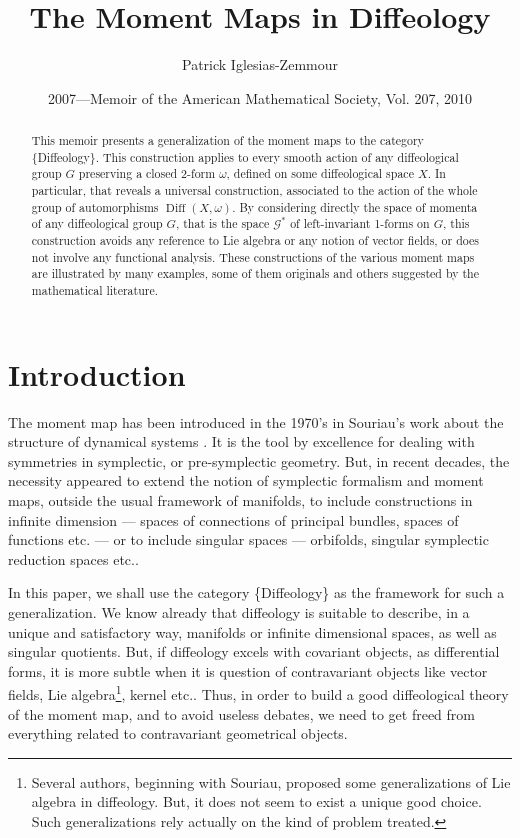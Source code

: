 \documentclass[10pt,reqno,twoside]{amsart}
\title{The Moment Maps in Diffeology}
\author{Patrick Iglesias-Zemmour}
\date{2007---Memoir of the American Mathematical Society, Vol. 207, 2010}
\newcommand{\cG}{\mathcal{G}}
\DeclareMathOperator{\Diff}{Diff}
\theoremstyle{plain}
\theoremstyle{definition}
\begin{document}
  
  \begin{abstract}
    This memoir presents a generalization of the moment maps to the category \{Diffeology\}.
    This construction applies to every smooth action of any diffeological group $G$ preserving a closed 2-form $\omega$,
    defined on some diffeological space $X$.
    In particular,
    that reveals a universal construction,
    associated to the action of the whole group of automorphisms $\Diff(X,\omega)$.
    By considering directly the space of momenta of any diffeological group $G$,
    that is the space $\cG^*$ of left-invariant 1-forms on $G$,
    this construction avoids any reference to Lie algebra or any notion of vector fields,
    or does not involve any functional analysis.
    These constructions of the various moment maps are illustrated by many examples,
    some of them originals and others suggested by the mathematical literature.
  \end{abstract}
  
  \maketitle
  
  \tableofcontents
  
  \section{Introduction}
  
  The moment map has been introduced in the 1970's in Souriau's work about the structure of dynamical systems \cite{Sou70}.
  It is the tool by excellence for dealing with symmetries in symplectic,
  or pre-symplectic geometry.
  But,
  in recent decades,
  the necessity appeared to extend the notion of symplectic formalism and moment maps,
  outside the usual framework of manifolds,
  to include constructions in infinite dimension
  --- spaces of connections of principal bundles, spaces of functions etc. ---
  or to include singular spaces
  --- orbifolds, singular symplectic reduction spaces etc..
  
  In this paper,
  we shall use the category \{Diffeology\} as the framework for such a generalization.
  We know already that diffeology is suitable to describe,
  in a unique and satisfactory way,
  manifolds or infinite dimensional spaces,
  as well as singular quotients.
  But,
  if diffeology excels with covariant objects,
  as differential forms,
  it is more subtle when it is question of contravariant objects like vector fields,
  Lie algebra\footnote{Several authors, beginning with Souriau, proposed some generalizations of Lie algebra in diffeology. But, it does not seem to exist a unique good choice. Such generalizations rely actually on the kind of problem treated.},
  kernel etc..
  Thus,
  in order to build a good diffeological theory of the moment map,
  and to avoid useless debates,
  we need to get freed from everything related to contravariant geometrical objects.
  
\end{document}
